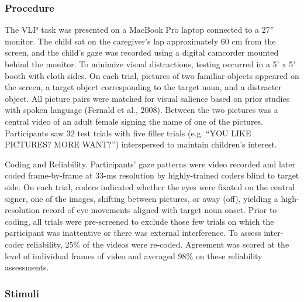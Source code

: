 \documentclass[oneside]{report}
\begin{document}
\subsubsection{Procedure}\label{procedure}

The VLP task was presented on a MacBook Pro laptop connected to a 27''
monitor. The child sat on the caregiver's lap approximately 60 cm from
the screen, and the child's gaze was recorded using a digital camcorder
mounted behind the monitor. To minimize visual distractions, testing
occurred in a 5' x 5' booth with cloth sides. On each trial, pictures of
two familiar objects appeared on the screen, a target object
corresponding to the target noun, and a distracter object. All picture
pairs were matched for visual salience based on prior studies with
spoken language (Fernald et al., 2008). Between the two pictures was a
central video of an adult female signing the name of one of the
pictures. Participants saw 32 test trials with five filler trials (e.g.
``YOU LIKE PICTURES? MORE WANT?'') interspersed to maintain children's
interest.

Coding and Reliability. Participants' gaze patterns were video recorded
and later coded frame-by-frame at 33-ms resolution by highly-trained
coders blind to target side. On each trial, coders indicated whether the
eyes were fixated on the central signer, one of the images, shifting
between pictures, or away (off), yielding a high-resolution record of
eye movements aligned with target noun onset. Prior to coding, all
trials were pre-screened to exclude those few trials on which the
participant was inattentive or there was external interference. To
assess inter-coder reliability, 25\% of the videos were re-coded.
Agreement was scored at the level of individual frames of video and
averaged 98\% on these reliability assessments.

\subsubsection{Stimuli}\label{stimuli}
\end{document}
